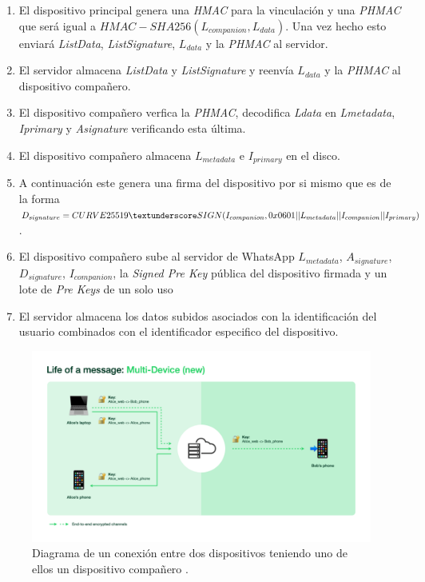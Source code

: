 \begin{description}
\begin{enumerate}
		\item El dispositivo principal genera una \emph{HMAC} para la vinculación y una \emph{PHMAC} que será igual a $HMAC-SHA256(L_{companion}, L_{data})$. Una vez hecho esto enviará \emph{ListData}, \emph{ListSignature}, $L_{data}$ y la \emph{PHMAC} al servidor.
		\item El servidor almacena \emph{ListData} y \emph{ListSignature} y reenvía $L_{data}$ y la \emph{PHMAC} al dispositivo compañero.
		\item El dispositivo compañero  verfica la \emph{PHMAC}, decodifica \emph{Ldata} en \emph{Lmetadata}, \emph{Iprimary} y \emph{Asignature} verificando esta última.
		\item El dispositivo compañero almacena $L_{metadata}$ e $I_{primary}$ en el disco.
		\item A continuación este genera una firma del dispositivo por si mismo que es de la forma $D_{signature}=CURVE25519\textunderscore SIGN(I_{companion}, 0x0601\\ || L_{metadata} || I_{companion} || I_{primary})$.
		\item El dispositivo compañero sube al servidor de WhatsApp $L_{metadata}$, $A_{signature}$, $D_{signature}$, $I_{companion}$, la \emph{Signed Pre Key} pública del dispositivo firmada y un lote de \emph{Pre Keys} de un solo uso
		\item El servidor almacena los datos subidos asociados con la identificación del usuario combinados con el identificador especifico del dispositivo.
	\end{enumerate}
\end{description}


\begin{figure}[htb]
	\centering
	\includegraphics[scale=0.25]{imagenes/what1.png} 
	\caption{Diagrama de un conexión entre dos dispositivos teniendo uno de ellos un dispositivo compañero \cite{what1}.}
	\label{what1}
\end{figure}

